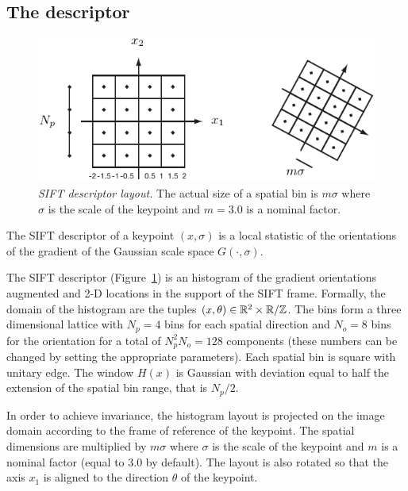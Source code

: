 \documentclass{article}
\begin{document}
\subsection{The descriptor}\label{sift.internals.descriptor}

\begin{figure}
\begin{center}
\includegraphics{figures/sift-descriptor}
\end{center}
\caption{{\sl SIFT descriptor layout.} The actual size of a spatial bin is $m\sigma$ where $\sigma$ is the scale of the keypoint and $m=3.0$ is a nominal factor.}\label{fig:descriptor}
\end{figure}

The SIFT descriptor of a keypoint $(x,\sigma)$ is a local statistic of the orientations of the gradient of the Gaussian scale space $G(\cdot,\sigma)$.

\medskip
{} The SIFT descriptor (Figure~\ref{fig:descriptor}) is an histogram of the gradient orientations augmented and {2-D} locations in the support of the SIFT frame. Formally, the domain of the histogram are the tuples $(x,\theta)\in \mathbb{R}^2 \times \mathbb{R}/\mathbb{Z}$. The bins form a three dimensional lattice with $N_p=4$ bins for each spatial direction and $N_o=8$ bins for the orientation for a total of $N_p^2 N_o=128$ components (these numbers can be changed by setting the appropriate parameters). Each spatial bin is square with unitary edge. The window $H(x)$ is Gaussian with deviation equal to half the extension of the spatial bin range, that is $N_p/2$.

\medskip
{} In order to achieve invariance, the histogram layout is projected on the image domain according to the frame of reference of the keypoint. The spatial dimensions are multiplied by $m\sigma$ where $\sigma$ is the scale of the keypoint and $m$ is a nominal factor (equal to 3.0 by default). The layout is also rotated so that the axis $x_1$ is aligned to the direction $\theta$ of the keypoint.
\end{document}
